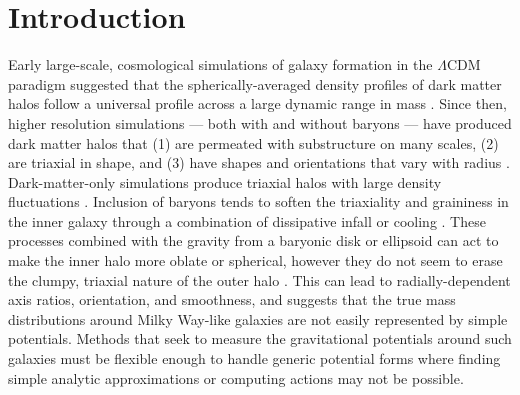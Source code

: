 \documentclass[letterpaper,12pt,preprint]{aastex}
\begin{document}

\section{Introduction}\label{sec:intro}

Early large-scale, cosmological simulations of galaxy formation in the $\Lambda$CDM paradigm suggested that the spherically-averaged density profiles of dark matter halos follow a universal profile across a large dynamic range in mass \citep{navarro96}. Since then, higher resolution simulations --- both with and without baryons --- have produced dark matter halos that (1) are permeated with substructure on many scales, (2) are triaxial in shape, and (3) have shapes and orientations that vary with radius \citep{dubinski91, jing02, kuhlen07, veraciro11}. Dark-matter-only simulations produce triaxial halos \citep{jing02} with large density fluctuations \citep{zemp09}. Inclusion of baryons tends to soften the triaxiality and graininess in the inner galaxy through a combination of dissipative infall \citep{dubinski94} or cooling \citep{bryan13}. These processes combined with the gravity from a baryonic disk or ellipsoid can act to make the inner halo more oblate or spherical, however they do not seem to erase the clumpy, triaxial nature of the outer halo \citep[e.g.,][]{pontzen12}. This can lead to radially-dependent axis ratios, orientation, and smoothness, and suggests that the true mass distributions around Milky Way-like galaxies are not easily represented by simple potentials. Methods that seek to measure the gravitational potentials around such galaxies must be flexible enough to handle generic potential forms where finding simple analytic approximations or computing actions may not be possible.
\end{document}
